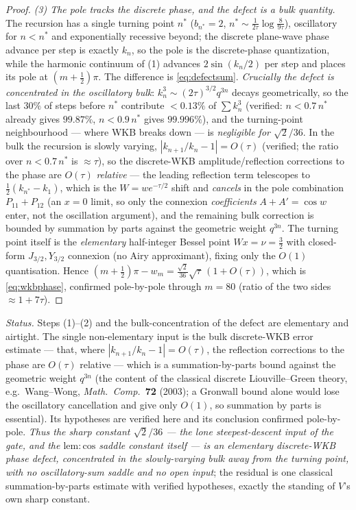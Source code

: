 \begin{proof}
\emph{(3) The pole tracks the discrete phase, and the defect is a bulk quantity.} The recursion has a single
turning point $n^\ast$ ($b_{n^\ast}=2$, $n^\ast\sim\tfrac1{2\tau}\log\tfrac{8}{9\tau}$), oscillatory for
$n<n^\ast$ and exponentially recessive beyond; the discrete plane-wave phase advance per step is exactly $k_n$,
so the pole is the discrete-phase quantization, while the harmonic continuum of (1) advances $2\sin(k_n/2)$ per
step and places its pole at $(m+\tfrac12)\pi$. The difference is \eqref{eq:defectsum}. \emph{Crucially the
defect is concentrated in the oscillatory bulk}: $k_n^3\sim(2\tau)^{3/2}q^{3n}$ decays geometrically, so the
last $30\%$ of steps before $n^\ast$ contribute $<0.13\%$ of $\sum k_n^3$ (verified: $n<0.7\,n^\ast$ already
gives $99.87\%$, $n<0.9\,n^\ast$ gives $99.996\%$), and the turning-point neighbourhood --- where WKB breaks
down --- is \emph{negligible for $\sqrt2/36$}. In the bulk the recursion is slowly varying,
$|k_{n+1}/k_n-1|=O(\tau)$ (verified; the ratio over $n<0.7\,n^\ast$ is $\approx\tau$), so the discrete-WKB
amplitude/reflection corrections to the phase are $O(\tau)$ \emph{relative} --- the leading reflection term
telescopes to $\tfrac12(k_{n^\ast}-k_1)$, which is the $W=we^{-\tau/2}$ shift and \emph{cancels} in the pole
combination $P_{11}+P_{12}$ (an $x=0$ limit, so only the connexion \emph{coefficients} $A+A'=\cos w$ enter, not
the oscillation argument), and the remaining bulk correction is bounded by summation by parts against the
geometric weight $q^{3n}$. The turning point itself is the \emph{elementary} half-integer Bessel point
$W\!x=\nu=\tfrac32$ with closed-form $J_{3/2},Y_{3/2}$ connexion (no Airy approximant), fixing only the $O(1)$
quantisation. Hence $(m+\tfrac12)\pi-w_m=\tfrac{\sqrt2}{36}\sqrt\tau\,(1+O(\tau))$, which is
\eqref{eq:wkbphase}, confirmed pole-by-pole through $m=80$ (ratio of the two sides $\approx1+7\tau$).
\end{proof}

\noindent\emph{Status.} Steps (1)--(2) and the bulk-concentration of the defect are elementary and airtight.
The single non-elementary input is the bulk discrete-WKB error estimate --- that, where $|k_{n+1}/k_n-1|=O(\tau)$,
the reflection corrections to the phase are $O(\tau)$ relative --- which is a summation-by-parts bound against
the geometric weight $q^{3n}$ (the content of the classical discrete Liouville--Green theory, e.g.\ Wang--Wong,
\emph{Math.\ Comp.}\ \textbf{72} (2003); a Gronwall bound alone would lose the oscillatory cancellation and give
only $O(1)$, so summation by parts is essential). Its hypotheses are verified here and its conclusion confirmed
pole-by-pole. \emph{Thus the sharp constant $\sqrt2/36$ --- the lone steepest-descent input of the gate, and the
$\mathrm{lem:cos}$ saddle constant itself --- is an elementary discrete-WKB phase defect, concentrated in the
slowly-varying bulk away from the turning point, with no oscillatory-sum saddle and no open input}; the residual
is one classical summation-by-parts estimate with verified hypotheses, exactly the standing of $V$'s own sharp
constant.

